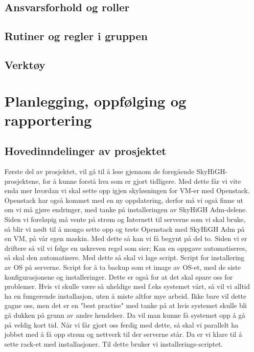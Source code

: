 \documentclass[12pt,a4paper]{article}
\begin{document}
\subsection{Ansvarsforhold og roller}
\subsection{Rutiner og regler i gruppen}
\subsection{Verktøy}

\section{Planlegging, oppfølging og rapportering}
\subsection{Hovedinndelinger av prosjektet}
Første del av prosjektet, vil gå til å lese gjennom de foregående SkyHiGH-prosjektene, for å kunne forstå hva som er 
gjort tidligere. Med dette får vi vite enda mer hvordan vi skal sette opp igjen skyløsningen for VM-er med Openstack.
Openstack har også kommet med en ny oppdatering, derfor må vi også finne ut om vi må gjøre endringer, med tanke på installeringen 
av SkyHiGH Adm-delene. Siden vi foreløpig må vente på strøm og Internett til serverne som vi skal bruke, så blir vi nødt til å mongo
sette opp og teste Openstack med SkyHiGH Adm på en VM, på vår egen maskin. \newline \newline
Med dette så kan vi få begynt på del to. Siden vi er driftere så vil vi følge en uskreven regel som sier; Kan en oppgave automatiseres, så skal den automatisere.
Med dette så skal vi lage script. Script for installering av OS på serverne. Script for å ta backup som et image av OS-et, med de siste konfigurasjonene og installeringer.
Dette er også for at det skal spare oss for problemer. Hvis vi skulle være så uheldige med f.eks systemet vårt, så vil vi alltid ha en fungerende installasjon, uten å miste
altfor mye arbeid. Ikke bare vil dette gagne oss, men det er en "best practise" med tanke på at hvis systemet skulle bli gå dukken på grunn av andre hendelser. Da vil 
man kunne få systemet opp å gå på veldig kort tid. \newline \newline
Når vi får gjort oss ferdig med dette, så skal vi parallelt ha jobbet med å få opp strøm og nettverk til der serverne står. Da er vi klare
til å sette rack-et med installasjoner. Til dette bruker vi installerings-scriptet. 
\end{document}
